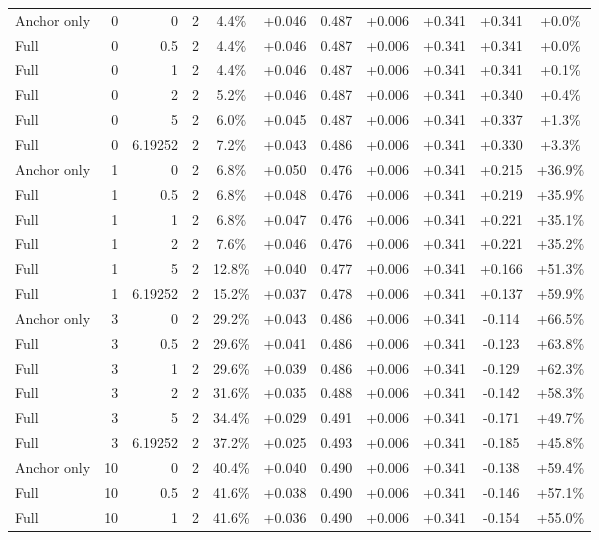 \begin{table}[htbp]
\begin{tabular}{lrrrccccccc}
Anchor only & 0 & 0 & 2 & 4.4\% & +0.046 & 0.487 & +0.006 & +0.341 & +0.341 & +0.0\% \\
Full & 0 & 0.5 & 2 & 4.4\% & +0.046 & 0.487 & +0.006 & +0.341 & +0.341 & +0.0\% \\
Full & 0 & 1 & 2 & 4.4\% & +0.046 & 0.487 & +0.006 & +0.341 & +0.341 & +0.1\% \\
Full & 0 & 2 & 2 & 5.2\% & +0.046 & 0.487 & +0.006 & +0.341 & +0.340 & +0.4\% \\
Full & 0 & 5 & 2 & 6.0\% & +0.045 & 0.487 & +0.006 & +0.341 & +0.337 & +1.3\% \\
Full & 0 & 6.19252 & 2 & 7.2\% & +0.043 & 0.486 & +0.006 & +0.341 & +0.330 & +3.3\% \\
Anchor only & 1 & 0 & 2 & 6.8\% & +0.050 & 0.476 & +0.006 & +0.341 & +0.215 & +36.9\% \\
Full & 1 & 0.5 & 2 & 6.8\% & +0.048 & 0.476 & +0.006 & +0.341 & +0.219 & +35.9\% \\
Full & 1 & 1 & 2 & 6.8\% & +0.047 & 0.476 & +0.006 & +0.341 & +0.221 & +35.1\% \\
Full & 1 & 2 & 2 & 7.6\% & +0.046 & 0.476 & +0.006 & +0.341 & +0.221 & +35.2\% \\
Full & 1 & 5 & 2 & 12.8\% & +0.040 & 0.477 & +0.006 & +0.341 & +0.166 & +51.3\% \\
Full & 1 & 6.19252 & 2 & 15.2\% & +0.037 & 0.478 & +0.006 & +0.341 & +0.137 & +59.9\% \\
Anchor only & 3 & 0 & 2 & 29.2\% & +0.043 & 0.486 & +0.006 & +0.341 & -0.114 & +66.5\% \\
Full & 3 & 0.5 & 2 & 29.6\% & +0.041 & 0.486 & +0.006 & +0.341 & -0.123 & +63.8\% \\
Full & 3 & 1 & 2 & 29.6\% & +0.039 & 0.486 & +0.006 & +0.341 & -0.129 & +62.3\% \\
Full & 3 & 2 & 2 & 31.6\% & +0.035 & 0.488 & +0.006 & +0.341 & -0.142 & +58.3\% \\
Full & 3 & 5 & 2 & 34.4\% & +0.029 & 0.491 & +0.006 & +0.341 & -0.171 & +49.7\% \\
Full & 3 & 6.19252 & 2 & 37.2\% & +0.025 & 0.493 & +0.006 & +0.341 & -0.185 & +45.8\% \\
Anchor only & 10 & 0 & 2 & 40.4\% & +0.040 & 0.490 & +0.006 & +0.341 & -0.138 & +59.4\% \\
Full & 10 & 0.5 & 2 & 41.6\% & +0.038 & 0.490 & +0.006 & +0.341 & -0.146 & +57.1\% \\
Full & 10 & 1 & 2 & 41.6\% & +0.036 & 0.490 & +0.006 & +0.341 & -0.154 & +55.0\% \\

\end{tabular}
\end{table}
